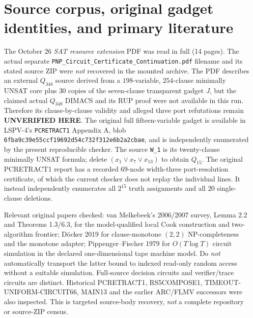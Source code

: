 \documentclass[11pt]{article}
\begin{document}
\section{Source corpus, original gadget identities, and primary literature}
The October 26 \emph{SAT resource extension} PDF was read in full (14 pages).
The actual separate \texttt{PNP\_Circuit\_Certificate\_Continuation.pdf}
filename and its stated source ZIP were \emph{not} recovered in
the mounted archive. The PDF describes an external $Q_{348}$ source
derived from a $198$-variable, $254$-clause minimally UNSAT core plus
$30$ copies of the seven-clause transparent gadget $J$, but the
claimed actual $Q_{348}$ DIMACS and its RUP proof were not available
in this run. Therefore its clause-by-clause validity and alleged
three port refutations remain \textbf{UNVERIFIED HERE}.
The original full fifteen-variable gadget is available in
LSPV-4's \texttt{PCRETRACT1} Appendix A, blob
\texttt{6fba9c39e55ccf19692d54c732f312e6b2a2cbae}, and is
independently enumerated by the present reproducible checker. The source
\texttt{W_1} is its twenty-clause minimally UNSAT formula; delete
$(x_1\vee x_7\vee x_{13})$ to obtain $Q_{15}$.
The original PCRETRACT1 report has a recorded $69$-node width-three
port-resolution certificate, of which the current checker does not
replay the individual lines. It instead independently enumerates all
$2^{15}$ truth assignments and all $20$ single-clause deletions.

Relevant original papers checked: van Melkebeek's 2006/2007 survey,
Lemma 2.2 and Theorems 1.3/6.3, for the model-qualified local Cook
construction and two-algorithm frontier; D\"ocker 2019 for clause-monotone
$(2,2)$ NP-completeness and the monotone adapter; Pippenger--Fischer 1979
for $O(T\log T)$ circuit simulation in the declared one-dimensional
tape machine model. Do \emph{not} automatically transport the latter
bound to indexed read-only random access without a suitable simulation.
Full-source decision circuits and verifier/trace circuits are distinct.
Historical PCRETRACT1, RS5COMPOSE1, TIMEOUT-UNIFORM-CIRCUIT66,
MAIN13 and the earlier ARC/FLMV successors were also inspected.
This is targeted source-body recovery, \emph{not} a complete repository
or source-ZIP census.
\end{document}
